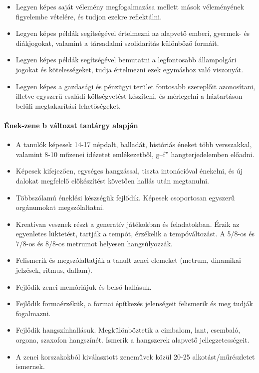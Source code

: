 \begin{itemize}
\item Legyen képes saját vélemény megfogalmazása mellett mások véleményének figyelembe vételére, és tudjon ezekre reflektálni.
\item Legyen képes példák segítségével értelmezni az alapvető emberi, gyermek- és diákjogokat, valamint a társadalmi szolidaritás különböző formáit.
\item Legyen képes példák segítségével bemutatni a legfontosabb állampolgári jogokat és kötelességeket, tudja értelmezni ezek egymáshoz való viszonyát.
\item Legyen képes a gazdasági és pénzügyi terület fontosabb szereplőit azonosítani, illetve egyszerű családi költségvetést készíteni, és mérlegelni a háztartáson belüli megtakarítási lehetőségeket.
\end{itemize}
\paragraph{Ének-zene
  b változat tantárgy alapján}
\begin{itemize}
\item A tanulók képesek 14-17 népdalt, balladát, históriás éneket több versszakkal, valamint 8-10 műzenei idézetet emlékezetből, g–f” hangterjedelemben előadni.
\item Képesek kifejezően, egységes hangzással, tiszta intonációval énekelni, és új dalokat megfelelő előkészítést követően hallás után megtanulni.
\item Többszólamú éneklési készségük fejlődik. Képesek csoportosan egyszerű orgánumokat megszólaltatni.
\item Kreatívan vesznek részt a generatív játékokban és feladatokban. Érzik az egyenletes lüktetést, tartják a tempót, érzékelik a tempóváltozást. A 5/8-os és 7/8-os és 8/8-os metrumot helyesen hangsúlyozzák.
\item Felismerik és megszólaltatják a tanult zenei elemeket (metrum, dinamikai jelzések, ritmus, dallam).
\item Fejlődik zenei memóriájuk és belső hallásuk.
\item Fejlődik formaérzékük, a formai építkezés jelenségeit felismerik és meg tudják fogalmazni.
\item Fejlődik hangszínhallásuk. Megkülönböztetik a cimbalom, lant, csembaló, orgona, szaxofon hangszínét. Ismerik a hangszerek alapvető jellegzetességeit.
\item A zenei korszakokból kiválasztott zeneművek közül 20-25 alkotást/műrészletet ismernek.
\end{itemize}
